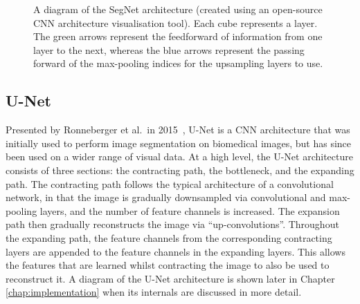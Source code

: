 \begin{figure}[t]
    \centering
    \hspace*{-0.3cm}
    
    \caption[A diagram of the SegNet architecture (created using an open-source CNN architecture visualisation tool). Each cube represents a layer. The green arrows represent the feedforward of information from one layer to the next, whereas the blue arrows represent the passing forward of the max-pooling indices for the upsampling layers to use.]{A diagram of the SegNet architecture (created using an open-source CNN architecture visualisation tool\footnotemark). Each cube represents a layer. The green arrows represent the feedforward of information from one layer to the next, whereas the blue arrows represent the passing forward of the max-pooling indices for the upsampling layers to use.}
    \label{fig:segnet}
\end{figure}


\subsection{U-Net}

Presented by Ronneberger et al.\ in 2015~\cite{ronneberger2015u}, U-Net is a CNN architecture that was initially used to perform image segmentation on biomedical images, but has since been used on a wider range of visual data. At a high level, the U-Net architecture consists of three sections: the contracting path, the bottleneck, and the expanding path. The contracting path follows the typical architecture of a convolutional network, in that the image is gradually downsampled via convolutional and max-pooling layers, and the number of feature channels is increased. The expansion path then gradually reconstructs the image via ``up-convolutions''. Throughout the expanding path, the feature channels from the corresponding contracting layers are appended to the feature channels in the expanding layers. This allows the features that are learned whilst contracting the image to also be used to reconstruct it. A diagram of the U-Net architecture is shown later in Chapter \ref{chap:implementation} when its internals are discussed in more detail.

